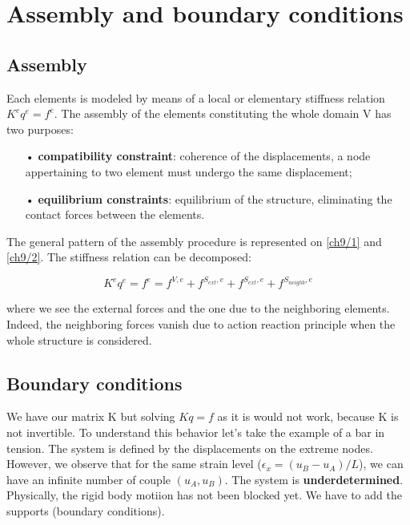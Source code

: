 
\chapter{Assembly and boundary conditions}
\section{Assembly}
	Each elements is modeled by means of a local or elementary stiffness relation $K^e q^e = f^e$. The assembly of the elements constituting the whole domain V has two purposes:
	
	\begin{itemize}
	\item[•] \textbf{compatibility constraint}: coherence of the displacements, a node appertaining to two element must undergo the same displacement;
	
	\item[•] \textbf{equilibrium constraints}: equilibrium of the structure, eliminating the contact forces between the elements. 
	\end{itemize}
	
	
	The general pattern of the assembly procedure is represented on \autoref{ch9/1} and \autoref{ch9/2}. The stiffness relation can be decomposed: 
	
	\begin{equation}
	K^eq^e= f^e = f^{V,e} + f^{S_{ext},e} + f^{S_{ext},e} + f^{S_{neighb},e}
	\end{equation}
	
	where we see the external forces and the one due to the neighboring elements. Indeed, the neighboring forces vanish due to action reaction principle when the whole structure is considered. 
	
\section{Boundary conditions}
	We have our matrix K but solving $Kq = f$ as it is would not work, because K is not invertible. To understand this behavior let's take the example of a bar in tension. The system is defined by the displacements on the extreme nodes. However, we observe that for the same strain level ($\epsilon _x = (u_B - u_A)/L$), we can have an infinite number of couple $(u_A, u_B)$. The system is \textbf{underdetermined}. Physically, the rigid body motiion has not been blocked yet. We have to add the supports (boundary conditions). \\
	
